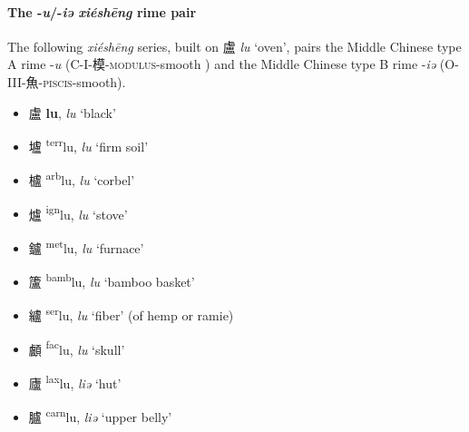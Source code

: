 \paragraph{The -\textit{u}/-\textit{iə} \textit{xiéshēng} rime pair}
\label{par:u-iə-XS-pair}
The following \textit{xiéshēng} series, built on  {\large{盧}} \textit{lu} `oven',%
pairs the Middle Chinese type A rime -\textit{u} (C-I-模-\textsc{modulus}-smooth ) and the Middle Chinese type B rime -\textit{iə} (O-III-魚-\textsc{piscis}-smooth). 




\begin{itemize}  
    \item {\Large{盧}} %
    \textbf{{\large{lu}}},
    \textit{lu} `black'        %
    
    \item {\Large{壚}} %
    {\large{{\textsuperscript{terr}}lu}},
    \textit{lu} `firm soil'        %
    
    \item {\Large{櫨}} %
    {\large{{\textsuperscript{arb}}lu}},
    \textit{lu} `corbel'        %
    
    \item {\Large{爐}} %
    {\large{{\textsuperscript{ign}}lu}},
    \textit{lu} `stove'        %
    
    \item {\Large{鑪}} %
    {\large{{\textsuperscript{met}}lu}},
    \textit{lu} `furnace'        %
    
    \item {\Large{籚}} %
    {\large{{\textsuperscript{bamb}}lu}},
    \textit{lu} `bamboo basket'        %
    
    \item {\Large{纑}} %
    {\large{{\textsuperscript{ser}}lu}},
    \textit{lu} `fiber' (of hemp or ramie)        %
    
    \item {\Large{顱}} %
    {\large{{\textsuperscript{fac}}lu}},
    \textit{lu} `skull'        %
    
    \item {\Large{廬}} %
    {\large{{\textsuperscript{lax}}lu}},
    \textit{liə} `hut'       %
    
    \item {\Large{臚}} %
    {\large{{\textsuperscript{carn}}lu}},
    \textit{liə} `upper belly'       %
    
\end{itemize}

